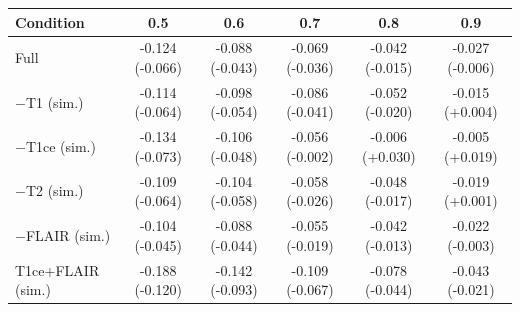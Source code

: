 \begin{tabular}{lccccc}
\toprule
Condition & 0.5 & 0.6 & 0.7 & 0.8 & 0.9 \\
\midrule
Full & -0.124 (-0.066) & -0.088 (-0.043) & -0.069 (-0.036) & -0.042 (-0.015) & -0.027 (-0.006) \\
$-$T1 (sim.) & -0.114 (-0.064) & -0.098 (-0.054) & -0.086 (-0.041) & -0.052 (-0.020) & -0.015 (+0.004) \\
$-$T1ce (sim.) & -0.134 (-0.073) & -0.106 (-0.048) & -0.056 (-0.002) & -0.006 (+0.030) & -0.005 (+0.019) \\
$-$T2 (sim.) & -0.109 (-0.064) & -0.104 (-0.058) & -0.058 (-0.026) & -0.048 (-0.017) & -0.019 (+0.001) \\
$-$FLAIR (sim.) & -0.104 (-0.045) & -0.088 (-0.044) & -0.055 (-0.019) & -0.042 (-0.013) & -0.022 (-0.003) \\
T1ce+FLAIR (sim.) & -0.188 (-0.120) & -0.142 (-0.093) & -0.109 (-0.067) & -0.078 (-0.044) & -0.043 (-0.021) \\
\bottomrule
\end{tabular}
